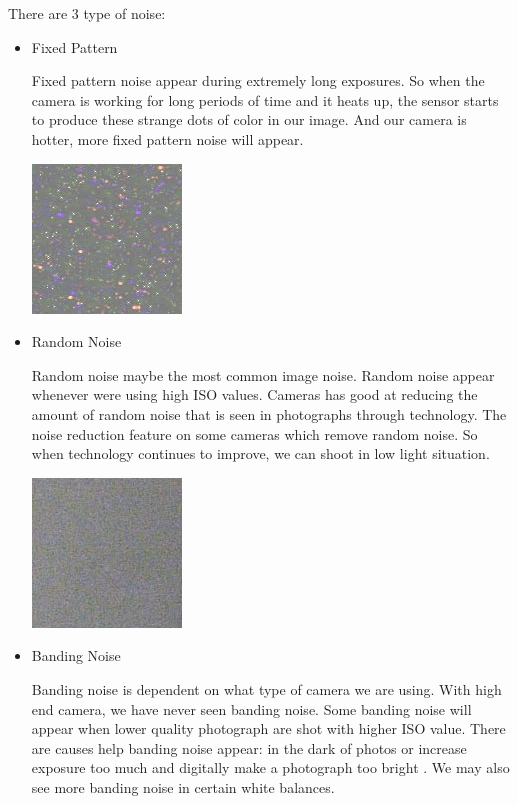 There are 3 type of noise:
\begin{itemize}
\item Fixed Pattern 

Fixed pattern noise appear during extremely long exposures. So when the camera is working for long periods
of time and it heats up, the sensor starts to produce these strange dots of color in our image. And our camera
is hotter, more fixed pattern noise will appear.

\begin{center}
	\includegraphics{fix.png}
\end{center}
\newpage
\item Random Noise

Random noise maybe the most common image noise. Random noise appear whenever were using high ISO
values.
Cameras has good at reducing the amount of random noise that is seen in photographs through technology.
The noise reduction feature on some cameras which remove random noise. So when technology continues to
improve, we can shoot in low light situation.

\begin{center}
	\includegraphics{random.png}

\end{center}



\item Banding Noise

Banding noise is dependent on what type of camera we are using. With high end camera, we have never
seen banding noise. Some banding noise will appear when lower quality photograph are shot with higher
ISO value.
There are causes help banding noise appear: in the dark of photos or increase exposure too much and
digitally make a photograph too bright . We may also see more banding noise in certain white balances.


\end{itemize}
